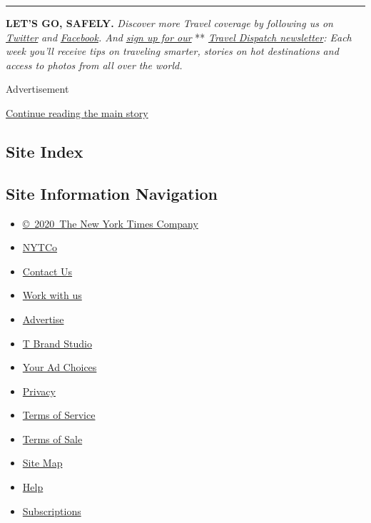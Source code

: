 \begin{center}\rule{0.5\linewidth}{\linethickness}\end{center}

\textbf{LET'S GO, SAFELY.} \emph{Discover more Travel coverage by
following us on}
\href{https://twitter.com/nytimestravel}{\emph{Twitter}} \emph{and}
\href{https://www.facebook.com/nytimestravel/}{\emph{Facebook}}\emph{.
And}
\href{https://www.nytimes.com/newsletters/traveldispatch?action=click\&module=inline\&pgtype=Article}{\emph{sign
up for our}} **
\href{https://www.nytimes.com/newsletters/traveldispatch}{\emph{Travel
Dispatch newsletter}}\emph{: Each week you'll receive tips on traveling
smarter, stories on hot destinations and access to photos from all over
the world.}

Advertisement

\protect\hyperlink{after-bottom}{Continue reading the main story}

\hypertarget{site-index}{%
\subsection{Site Index}\label{site-index}}

\hypertarget{site-information-navigation}{%
\subsection{Site Information
Navigation}\label{site-information-navigation}}

\begin{itemize}
\tightlist
\item
  \href{https://help.nytimes.com/hc/en-us/articles/115014792127-Copyright-notice}{©~2020~The
  New York Times Company}
\end{itemize}

\begin{itemize}
\tightlist
\item
  \href{https://www.nytco.com/}{NYTCo}
\item
  \href{https://help.nytimes.com/hc/en-us/articles/115015385887-Contact-Us}{Contact
  Us}
\item
  \href{https://www.nytco.com/careers/}{Work with us}
\item
  \href{https://nytmediakit.com/}{Advertise}
\item
  \href{http://www.tbrandstudio.com/}{T Brand Studio}
\item
  \href{https://www.nytimes.com/privacy/cookie-policy\#how-do-i-manage-trackers}{Your
  Ad Choices}
\item
  \href{https://www.nytimes.com/privacy}{Privacy}
\item
  \href{https://help.nytimes.com/hc/en-us/articles/115014893428-Terms-of-service}{Terms
  of Service}
\item
  \href{https://help.nytimes.com/hc/en-us/articles/115014893968-Terms-of-sale}{Terms
  of Sale}
\item
  \href{https://spiderbites.nytimes.com}{Site Map}
\item
  \href{https://help.nytimes.com/hc/en-us}{Help}
\item
  \href{https://www.nytimes.com/subscription?campaignId=37WXW}{Subscriptions}
\end{itemize}

